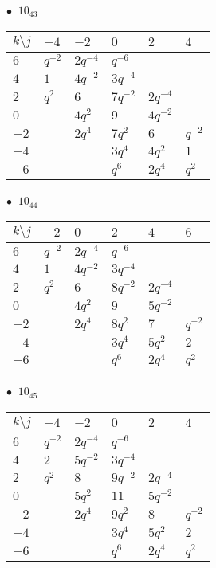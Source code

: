 %
\begin{minipage}{\linewidth}
$\bullet\ $ $10_{43}$ \vspace{0.5em} \\
\begin{tabular}{l|lllll}
$k \setminus j$ & $-4$ & $-2$ & $0$ & $2$ & $4$ \\
\hline
$6$ & $q^{-2}$ & $2q^{-4}$ & $q^{-6}$ &  &  \\
$4$ & $1$ & $4q^{-2}$ & $3q^{-4}$ &  &  \\
$2$ & $q^{2}$ & $6$ & $7q^{-2}$ & $2q^{-4}$ &  \\
$0$ &  & $4q^{2}$ & $9$ & $4q^{-2}$ &  \\
$-2$ &  & $2q^{4}$ & $7q^{2}$ & $6$ & $q^{-2}$ \\
$-4$ &  &  & $3q^{4}$ & $4q^{2}$ & $1$ \\
$-6$ &  &  & $q^{6}$ & $2q^{4}$ & $q^{2}$ \\
\end{tabular}
\vspace{2em}
\end{minipage}
%
\begin{minipage}{\linewidth}
$\bullet\ $ $10_{44}$ \vspace{0.5em} \\
\begin{tabular}{l|lllll}
$k \setminus j$ & $-2$ & $0$ & $2$ & $4$ & $6$ \\
\hline
$6$ & $q^{-2}$ & $2q^{-4}$ & $q^{-6}$ &  &  \\
$4$ & $1$ & $4q^{-2}$ & $3q^{-4}$ &  &  \\
$2$ & $q^{2}$ & $6$ & $8q^{-2}$ & $2q^{-4}$ &  \\
$0$ &  & $4q^{2}$ & $9$ & $5q^{-2}$ &  \\
$-2$ &  & $2q^{4}$ & $8q^{2}$ & $7$ & $q^{-2}$ \\
$-4$ &  &  & $3q^{4}$ & $5q^{2}$ & $2$ \\
$-6$ &  &  & $q^{6}$ & $2q^{4}$ & $q^{2}$ \\
\end{tabular}
\vspace{2em}
\end{minipage}
%
\begin{minipage}{\linewidth}
$\bullet\ $ $10_{45}$ \vspace{0.5em} \\
\begin{tabular}{l|lllll}
$k \setminus j$ & $-4$ & $-2$ & $0$ & $2$ & $4$ \\
\hline
$6$ & $q^{-2}$ & $2q^{-4}$ & $q^{-6}$ &  &  \\
$4$ & $2$ & $5q^{-2}$ & $3q^{-4}$ &  &  \\
$2$ & $q^{2}$ & $8$ & $9q^{-2}$ & $2q^{-4}$ &  \\
$0$ &  & $5q^{2}$ & $11$ & $5q^{-2}$ &  \\
$-2$ &  & $2q^{4}$ & $9q^{2}$ & $8$ & $q^{-2}$ \\
$-4$ &  &  & $3q^{4}$ & $5q^{2}$ & $2$ \\
$-6$ &  &  & $q^{6}$ & $2q^{4}$ & $q^{2}$ \\
\end{tabular}
\vspace{2em}
\end{minipage}
